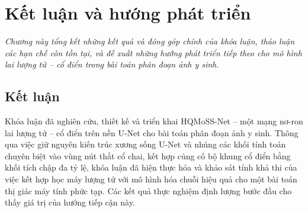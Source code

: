 \chapter{Kết luận và hướng phát triển}
\label{Chapter6}

\textit{Chương này tổng kết những kết quả và đóng góp chính của khóa luận, thảo luận các hạn chế còn tồn tại, và đề xuất những hướng phát triển tiếp theo cho mô hình lai lượng tử -- cổ điển trong bài toán phân đoạn ảnh y sinh.}

\section{Kết luận}
Khóa luận đã nghiên cứu, thiết kế và triển khai HQMoSS-Net -- một mạng nơ-ron lai lượng tử -- cổ điển trên nền U-Net cho bài toán phân đoạn ảnh y sinh. Thông qua việc giữ nguyên kiến trúc xương sống U-Net và nhúng các khối tính toán chuyên biệt vào vùng nút thắt cổ chai, kết hợp củng cố bộ khung cổ điển bằng khối tích chập đa tỷ lệ, khóa luận đã hiện thực hóa và khảo sát tính khả thi của việc kết hợp học máy lượng tử với mô hình hóa chuỗi hiệu quả cho một bài toán thị giác máy tính phức tạp. Các kết quả thực nghiệm định lượng bước đầu cho thấy giá trị của hướng tiếp cận này.

